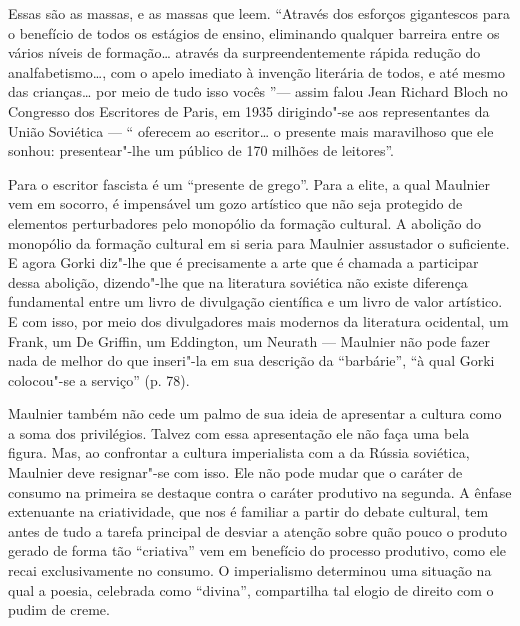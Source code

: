 Essas são as massas, e as massas que leem. ``Através dos esforços
gigantescos para o benefício de todos os estágios de ensino, eliminando
qualquer barreira entre os vários níveis de formação\ldots{} através da
surpreendentemente rápida redução do analfabetismo\ldots{}, com o apelo
imediato à invenção literária de todos, e até mesmo das crianças\ldots{} por
meio de tudo isso vocês ''--- assim falou Jean Richard Bloch no Congresso
dos Escritores de Paris, em 1935 dirigindo"-se aos representantes da
União Soviética --- `` oferecem ao escritor\ldots{} o presente mais
maravilhoso que ele sonhou: presentear"-lhe um público de 170 milhões de
leitores''.

Para o escritor fascista é um ``presente de grego''. Para a elite, a
qual Maulnier vem em socorro, é impensável um gozo artístico que não
seja protegido de elementos perturbadores pelo monopólio da formação
cultural. A abolição do monopólio da formação cultural em si seria para
Maulnier assustador o suficiente. E agora Gorki diz"-lhe que é
precisamente a arte que é chamada a participar dessa abolição,
dizendo"-lhe que na literatura soviética não existe diferença fundamental
entre um livro de divulgação científica e um livro de valor artístico. E
com isso, por meio dos divulgadores mais modernos da literatura
ocidental, um Frank, um De Griffin, um Eddington, um Neurath --- Maulnier
não pode fazer nada de melhor do que inseri"-la em sua descrição da
``barbárie'', ``à qual Gorki colocou"-se a serviço'' (p. 78).

Maulnier também não cede um palmo de sua ideia de apresentar a cultura
como a soma dos privilégios. Talvez com essa apresentação ele não faça
uma bela figura. Mas, ao confrontar a cultura imperialista com a da
Rússia soviética, Maulnier deve resignar"-se com isso. Ele não pode mudar
que o caráter de consumo na primeira se destaque contra o caráter
produtivo na segunda. A ênfase extenuante na criatividade, que nos é
familiar a partir do debate cultural, tem antes de tudo a tarefa
principal de desviar a atenção sobre quão pouco o produto gerado de
forma tão ``criativa'' vem em benefício do processo produtivo, como ele
recai exclusivamente no consumo. O imperialismo determinou uma situação
na qual a poesia, celebrada como ``divina'', compartilha tal elogio de
direito com o pudim de creme.

